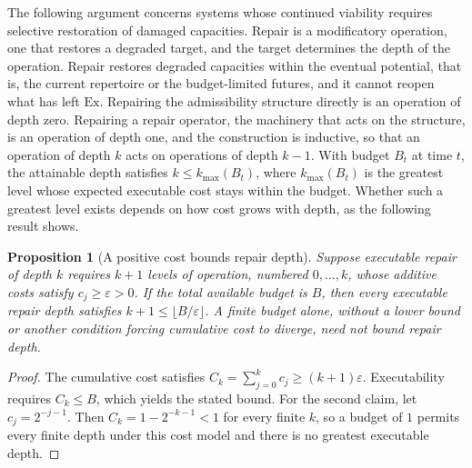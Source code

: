 \documentclass[11pt]{article}
\theoremstyle{definition}
\theoremstyle{plain}
\newtheorem{proposition}{Proposition}
\theoremstyle{remark}
\begin{document}
The following argument concerns systems whose continued viability requires selective restoration of damaged capacities. Repair is a modificatory operation, one that restores a degraded target, and the target determines the depth of the operation. Repair restores degraded capacities within the eventual potential, that is, the current repertoire or the budget-limited futures, and it cannot reopen what has left $\mathrm{Ex}$. Repairing the admissibility structure directly is an operation of depth zero. Repairing a repair operator, the machinery that acts on the structure, is an operation of depth one, and the construction is inductive, so that an operation of depth $k$ acts on operations of depth $k-1$. With budget $B_t$ at time $t$, the attainable depth satisfies $k \le k_{\max}(B_t)$, where $k_{\max}(B_t)$ is the greatest level whose expected executable cost stays within the budget. Whether such a greatest level exists depends on how cost grows with depth, as the following result shows.

\begin{proposition}[A positive cost bounds repair depth]
Suppose executable repair of depth $k$ requires $k + 1$ levels of operation, numbered $0, \ldots, k$, whose additive costs satisfy $c_j \ge \varepsilon > 0$. If the total available budget is $B$, then every executable repair depth satisfies $k + 1 \le \lfloor B / \varepsilon \rfloor$. A finite budget alone, without a lower bound or another condition forcing cumulative cost to diverge, need not bound repair depth.
\end{proposition}

\begin{proof}
The cumulative cost satisfies $C_k = \sum_{j=0}^{k} c_j \ge (k+1)\varepsilon$. Executability requires $C_k \le B$, which yields the stated bound. For the second claim, let $c_j = 2^{-j-1}$. Then $C_k = 1 - 2^{-k-1} < 1$ for every finite $k$, so a budget of $1$ permits every finite depth under this cost model and there is no greatest executable depth.
\end{proof}
\end{document}
